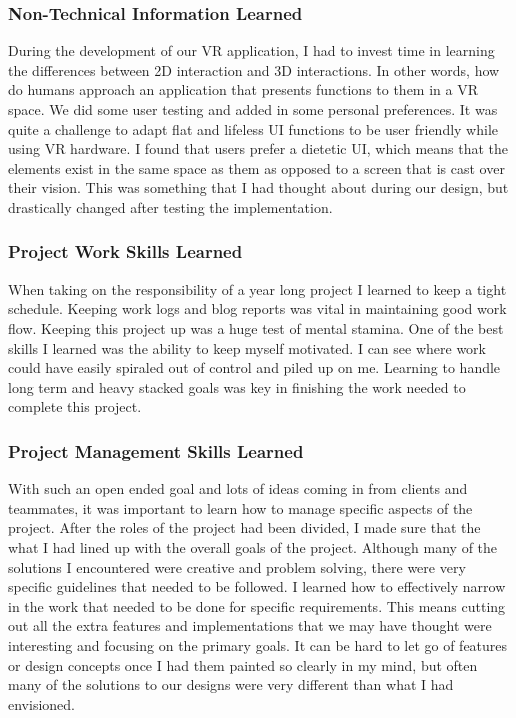 \documentclass[onecolumn, draftclsnofoot,10pt, compsoc]{IEEEtran}
\begin{document}
\subsubsection{Non-Technical Information Learned}
During the development of our VR application, I had to invest time in learning the differences between 2D interaction and 3D interactions. In other words, how do humans approach an application that presents functions to them in a VR space. We did some user testing and added in some personal preferences. It was quite a challenge to adapt flat and lifeless UI functions to be user friendly while using VR hardware. I found that users prefer a dietetic UI, which means that the elements exist in the same space as them as opposed to a screen that is cast over their vision. This was something that I had thought about during our design, but drastically changed after testing the implementation.
\subsubsection{Project Work Skills Learned}
When taking on the responsibility of a year long project I learned to keep a tight schedule. Keeping work logs and blog reports was vital in maintaining good work flow. Keeping this project up was a huge test of mental stamina. One of the best skills I learned was the ability to keep myself motivated. I can see where work could have easily spiraled out of control and piled up on me. Learning to handle long term and heavy stacked goals was key in finishing the work needed to complete this project. 
\subsubsection{Project Management Skills Learned}
With such an open ended goal and lots of ideas coming in from clients and teammates, it was important to learn how to manage specific aspects of the project. After the roles of the project had been divided, I made sure that the what I had lined up with the overall goals of the project. Although many of the solutions I encountered were creative and problem solving, there were very specific guidelines that needed to be followed. I learned how to effectively narrow in the work that needed to be done for specific requirements. This means cutting out all the extra features and implementations that we may have thought were interesting and focusing on the primary goals. It can be hard to let go of features or design concepts once I had them painted so clearly in my mind, but often many of the solutions to our designs were very different than what I had envisioned. 
\end{document}
